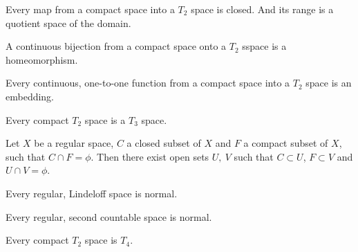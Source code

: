 \begin{corollary}
	Every map from a compact space into a $T_2$ space is closed. And its range is a quotient space of the domain.
\end{corollary}

\begin{corollary}
	A continuous bijection from a compact space onto a $T_2$ sspace is a homeomorphism.
\end{corollary}

\begin{corollary}
	Every continuous, one-to-one function from a compact space into a $T_2$ space is an embedding.
\end{corollary}

\begin{theorem}
	Every compact $T_2$ space is a $T_3$ space.
\end{theorem}

\begin{proposition}
	Let $X$ be a regular space, $C$ a closed subset of $X$ and $F$ a compact subset of $X$, such that $C \cap F = \phi$. Then there exist open sets $U,\ V$ such that $C \subset U$, $F \subset V$ and $U \cap V = \phi$.
\end{proposition}

\begin{theorem}
	Every regular, Lindeloff space is normal.
\end{theorem}

\begin{corollary}
	Every regular, second countable space is normal.
\end{corollary}

\begin{corollary}
	Every compact $T_2$ space is $T_4$.
\end{corollary}

